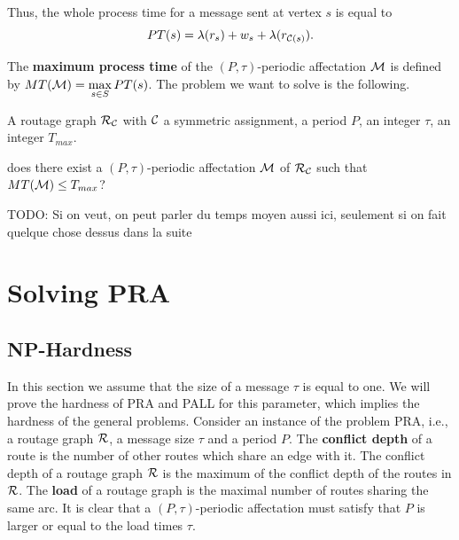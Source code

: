 \documentclass[a4paper,10pt]{article}
\newcommand{\todo}[1]{{\color{red} TODO: {#1}}}
\begin{document}
      Thus, the whole process time for a message sent at vertex $s$ is equal to
      $$
      PT(s)=\lambda(r_s)+ w_s+\lambda(r_{{\cal C}(s)}).
      $$
      
    The {\bf maximum process time} of the $(P,\tau)$-periodic affectation ${\cal M} $ is defined by $MT({\cal M})=\max\limits_{s \in S} PT(s)$. The problem we want to solve is the following. 


        A routage graph ${\cal R}_{\cal C}$ with ${\cal C}$ a symmetric assignment, a period $P$, an integer $\tau$, an integer $T_{max}$.

       does there exist a $(P,\tau)$-periodic affectation ${\cal M}$ of ${\cal R}_{\cal C}$ such that $MT({\cal M}) \leq T_{max}$?

      \todo{Si on veut, on peut parler du temps moyen aussi ici, seulement si on fait quelque chose dessus dans la suite}



  
\section{Solving PRA}
  \label{sec:complexity}
  \subsection{NP-Hardness}

 In this section we assume that the size of a message $\tau$ is equal to one. 
 We will prove the hardness of PRA and PALL for this parameter, which implies the hardness of the general problems. 
Consider an instance of the problem PRA, i.e., a routage graph $\cal{R}$, a message size $\tau$ and a period $P$. 
The {\bf conflict depth} of a route is the number of other routes which share an edge with it. 
The conflict depth of a routage graph  $\cal{R}$ is the maximum of the conflict depth of the routes in ${\cal R}$.
The {\bf load} of a routage graph is the maximal number of routes sharing the same arc.
It is clear that a $(P,\tau)$-periodic affectation must satisfy that $P$ is larger or equal to the load times $\tau$.
\end{document}
